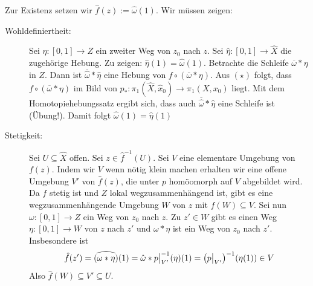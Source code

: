Zur Existenz setzen wir $\hat{f}(z) := \hat{\omega}(1)$. Wir müssen zeigen:
\begin{description}
	\item[Wohldefiniertheit:] Sei $\eta : [0,1] \to Z$ ein zweiter Weg von $z_0$ nach $z$. Sei $\hat{\eta} : [0,1] \to \hat{X}$ die zugehörige Hebung. Zu zeigen: 
	$\hat{\eta}(1) = \hat{\omega}(1)$. Betrachte die Schleife $\overline{\omega} * \eta$ in $Z$. Dann ist $\overline{\hat{\omega}} * \hat{\eta}$ eine Hebung von
	$f \circ (\overline{\omega} * \eta)$. Aus $(\star)$ folgt, dass $f \circ (\overline{\omega} * \eta )$ im Bild von $p_* : \pi_1(\hat{X}, \hat{x}_0) \to \pi_1(X,x_0)$ 
	liegt. Mit dem Homotopiehebungssatz ergibt sich, dass auch $\overline{\hat{\omega}} * \hat{\eta}$ eine Schleife ist (Übung!). Damit folgt 
	$\hat{\omega}(1)= \hat{\eta}(1)$
	\item[Stetigkeit:] Sei $U \subseteq \hat{X}$ offen. Sei $z \in \hat{f} ^{-1} (U)$. Sei $V$ eine elementare Umgebung von $f(z)$. Indem wir $V$ wenn nötig klein machen
	erhalten wir eine offene Umgebung $V'$ von $\hat{f}(z)$, die unter $p$ homöomorph auf $V$ abgebildet wird. Da $f$ stetig ist und $Z$ lokal wegzusammenhängend ist, gibt
	es eine wegzusammenhängende Umgebung $W$ von $z$ mit $f(W) \subseteq V$. Sei nun $\omega : [0,1] \to Z$ ein Weg von $z_0$ nach $z$. Zu $z' \in W$ gibt es einen Weg
	$\eta : [0,1] \to W$ von $z$ nach $z'$ und $\omega * \eta$ ist ein Weg von $z_0$ nach $z'$. Insbesondere ist 
	\[
		\hat{f}(z') = \widehat{(\omega * \eta)} (1)= \hat{\omega} * p\big|_{V'} ^{-1} (\eta) (1) = \enbrace*{p \big|_{V'}} ^{-1} \enbrace*{\eta(1)} \in V  
	\]
	Also $\hat{f}(W) \subseteq V' \subseteq U$. \bewende
\end{description}

